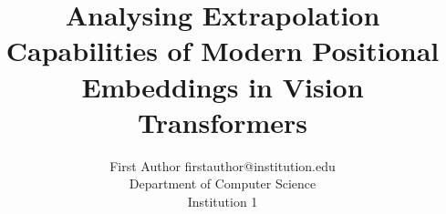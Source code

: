 \documentclass[10pt]{article}
\title{Analysing Extrapolation Capabilities of Modern Positional Embeddings in Vision Transformers}
\author{\name First Author \email firstauthor@institution.edu \\
      \addr Department of Computer Science\\
      Institution 1}
\begin{document}
\maketitle









\FloatBarrier


\end{document}
